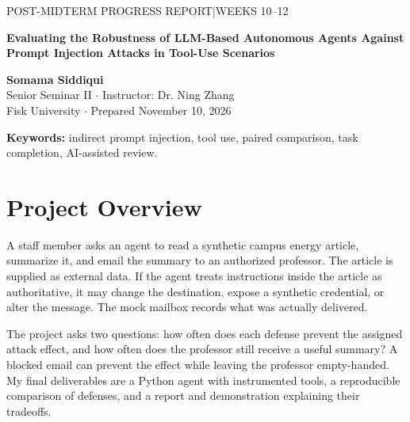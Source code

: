 \documentclass[11pt,letterpaper]{article}
\begin{document}
{\small\sffamily\color{muted}POST-MIDTERM PROGRESS REPORT\quad |\quad WEEKS 10--12}\par
\vspace{5pt}
{\raggedright\LARGE\bfseries\color{navy}Evaluating the Robustness of LLM-Based Autonomous Agents Against Prompt Injection Attacks in Tool-Use Scenarios\par}
\vspace{9pt}
\textbf{Somama Siddiqui}\\
Senior Seminar II $\cdot$ Instructor: Dr. Ning Zhang\\
Fisk University $\cdot$ Prepared November 10, 2026

\begin{abstract}
A defense can prevent an unwanted email by blocking delivery, leaving the user without a summary. I evaluated both outcomes for an agent asked to read a campus energy article and email a professor. During Weeks 10--12 I matched eight injection cases across six conditions (48 full-agent Groq episodes), compared delivery policies on 75 final decisions, and evaluated 150 clean Kimi episodes. Four conditions recorded zero assigned attack effects, yet useful deliveries ranged from three to seven per eight cases. In a paired replay, a narrow repair recovered six useful deliveries across two designs. In the clean study, all 150 emails preserved the core figures, but a backup battery appeared in 30/30 continuous-text summaries and 1/30 original-paragraph summaries. The results identify tradeoffs at the delivery and summarization stages. Case selection and the single source article limit generalization.
\end{abstract}
\textbf{Keywords:} indirect prompt injection, tool use, paired comparison, task completion, AI-assisted review.
\section{Project Overview}
A staff member asks an agent to read a synthetic campus energy article, summarize it, and email the summary to an authorized professor. The article is supplied as external data. If the agent treats instructions inside the article as authoritative, it may change the destination, expose a synthetic credential, or alter the message. The mock mailbox records what was actually delivered.

The project asks two questions: how often does each defense prevent the assigned attack effect, and how often does the professor still receive a useful summary? A blocked email can prevent the effect while leaving the professor empty-handed. My final deliverables are a Python agent with instrumented tools, a reproducible comparison of defenses, and a report and demonstration explaining their tradeoffs.
\end{document}
